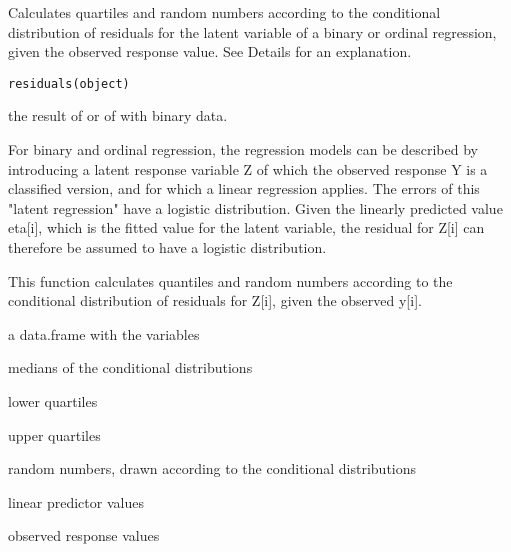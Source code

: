 \documentclass{article}
\begin{document}
\begin{Description}\relax
Calculates quartiles and random numbers according to the
conditional distribution of residuals for the latent variable of a
binary or ordinal regression, given the observed response value.
See Details for an explanation.
\end{Description}
\begin{Usage}
\begin{verbatim}
residuals(object)
\end{verbatim}
\end{Usage}
\begin{Arguments}
\begin{ldescription}
\item[\code{object}] the result of  or of
 with binary data.
\end{ldescription}
\end{Arguments}
\begin{Details}\relax
For binary and ordinal regression, the regression models can be
described by introducing a latent response variable Z of which the
observed response Y is a classified version, and for which a linear
regression applies. The errors of this "latent regression" have a
logistic distribution. Given the linearly predicted value eta[i],
which is the fitted value for the latent variable, the residual for
Z[i] can therefore be assumed to have a logistic distribution.

This function calculates quantiles and random numbers according to the
conditional distribution of residuals for Z[i], given the observed
y[i].
\end{Details}
\begin{Value}
a data.frame with the variables 
\begin{ldescription}
\item[\code{median}] medians of the conditional distributions
\item[\code{lowq}] lower quartiles
\item[\code{uppq}] upper quartiles
\item[\code{random}] random numbers, drawn according to the conditional
distributions
\item[\code{fit}] linear predictor values
\item[\code{y}] observed response values
\end{ldescription}
\end{Value}
\end{document}
